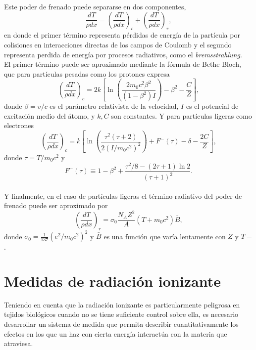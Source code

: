 Este poder de frenado puede separarse en dos componentes, 
\begin{equation}
	\frac{dT}{\rho dx}=\left(\frac{dT}{\rho dx}\right)_c+\left(\frac{dT}{\rho dx}\right)_r,
\end{equation}   
en donde el primer término representa pérdidas de energía de la partícula por colisiones en interacciones directas de los campos de Coulomb y el segundo representa perdida de energía por procesos radiativos, como el \textit{bremsstrahlung}.\\

El primer término puede ser aproximado mediante la fórmula de Bethe-Bloch, que para partículas pesadas como los protones expresa
\begin{equation}
	\left(\frac{d T}{\rho d x}\right)_{c}=2 k\left[\ln \left(\frac{2 m_{0} c^{2} \beta^{2}}{\left(1-\beta^{2}\right) I}\right)-\beta^{2} -\frac{C}{Z}\right],
\end{equation}
donde $\beta=v/c$ es el parámetro relativista de la velocidad, $I$ es el potencial de excitación medio del átomo, y $k,C$ son constantes. Y para partículas ligeras como electrones
\begin{equation}\left(\frac{d T}{\rho d x}\right)_{c}=k\left[\ln \left(\frac{\tau^{2}(\tau+2)}{2\left(I / m_{0} c^{2}\right)^{2}}\right)+F^{-}(\tau)-\delta-\frac{2 C}{Z}\right],\end{equation}
donde $\tau=T/m_0c^2$ y 
\begin{equation}F^{-}(\tau) \equiv 1-\beta^{2}+\frac{\tau^{2} / 8-(2 \tau+1) \ln 2}{(\tau+1)^{2}}.\end{equation}\\

Y finalmente, en el caso de partículas ligeras el término radiativo del poder de frenado puede ser aproximado por 
\begin{equation}\left(\frac{d T}{\rho d x}\right)_{r}=\sigma_{0} \frac{N_{A} Z^{2}}{A}\left(T+m_{0} c^{2}\right) \bar{B},\end{equation}
donde $\sigma_0=\frac{1}{137}(e^2/m_0c^2)^2$ y $\bar{B}$ es una función que varía lentamente con $Z$ y $T-$.

\section{Medidas de radiación ionizante}
Teniendo en cuenta que la radiación ionizante es particularmente peligrosa en tejidos biológicos cuando no se tiene suficiente control sobre ella, es necesario desarrollar un sistema de medida que permita describir cuantitativamente los efectos en los que un haz con cierta energía interactúa con la materia que atraviesa.\\

